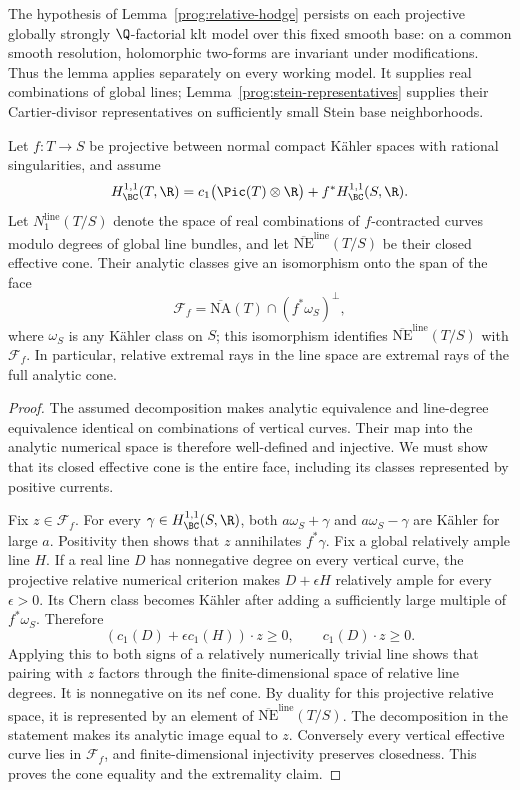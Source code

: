 The hypothesis of Lemma~\ref{prog:relative-hodge} persists on each
projective globally strongly \(\Q\)-factorial klt model over this fixed
smooth base: on a common smooth resolution, holomorphic two-forms are
invariant under modifications. Thus the lemma applies separately on
every working model. It supplies real combinations of global lines;
Lemma~\ref{prog:stein-representatives} supplies their Cartier-divisor
representatives on sufficiently small Stein base neighborhoods.

\begin{lemma}
\label{prog:projective-cone}
Let \(f:T\to S\) be projective between normal compact Kähler spaces
with rational singularities, and assume
\[
 H^{1,1}_{\BC}(T,\R)
   =c_1\bigl(\Pic(T)\otimes\R\bigr)
          +f^*H^{1,1}_{\BC}(S,\R).
\]
Let \(N_1^{\mathrm{line}}(T/S)\) denote the space of real combinations
of \(f\)-contracted curves modulo degrees of global line bundles,
and let \(\overline{\mathrm{NE}}^{\mathrm{line}}(T/S)\) be their
closed effective cone. Their analytic classes give an isomorphism
onto the span of the face
\[
 \mathcal F_f=
 \overline{\mathrm{NA}}(T)\cap(f^*\omega_S)^\perp,
\]
where \(\omega_S\) is any Kähler class on \(S\); this isomorphism
identifies \(\overline{\mathrm{NE}}^{\mathrm{line}}(T/S)\) with
\(\mathcal F_f\). In particular, relative extremal rays in the line
space are extremal rays of the full analytic cone.
\end{lemma}

\begin{proof}
The assumed decomposition makes analytic equivalence and line-degree
equivalence identical on combinations of vertical curves. Their map
into the analytic numerical space is therefore well-defined and
injective. We must show that its closed effective cone is the entire
face, including its classes represented by positive currents.

Fix \(z\in\mathcal F_f\). For every \(\gamma\in
H^{1,1}_{\BC}(S,\R)\), both \(a\omega_S+\gamma\) and
\(a\omega_S-\gamma\) are Kähler for large \(a\). Positivity then
shows that \(z\) annihilates \(f^*\gamma\). Fix a global relatively
ample line \(H\). If a real line \(D\) has nonnegative degree on
every vertical curve, the projective relative numerical criterion
makes \(D+\epsilon H\) relatively ample for every \(\epsilon>0\).
Its Chern class becomes Kähler after adding a sufficiently large
multiple of \(f^*\omega_S\). Therefore
\[
                 (c_1(D)+\epsilon c_1(H))\cdot z\geq0,
 \qquad c_1(D)\cdot z\geq0.
\]
Applying this to both signs of a relatively numerically trivial line
shows that pairing with \(z\) factors through the finite-dimensional
space of relative line degrees. It is nonnegative on its nef cone.
By duality for this projective relative space, it is represented by
an element of \(\overline{\mathrm{NE}}^{\mathrm{line}}(T/S)\).
The decomposition in the statement makes its analytic image equal
to \(z\). Conversely every vertical effective curve lies in
\(\mathcal F_f\), and finite-dimensional injectivity preserves
closedness. This proves the cone equality and the extremality claim.
\end{proof}
